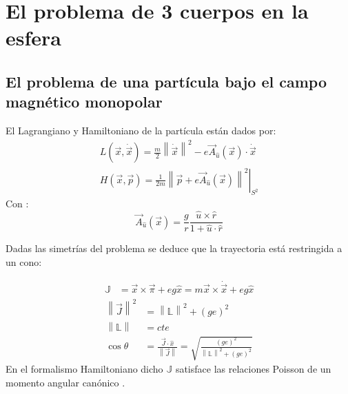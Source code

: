 \documentclass[xcolor=dvipsnames]{beamer}
\newcommand{\norm}[1]{\left\lVert #1 \right\rVert}
\newcommand{\roundP}[1]{\left( #1 \right)}
\begin{document}
\section{El problema de 3 cuerpos en la esfera}
\subsection{El problema de una partícula bajo el campo magnético monopolar}
\begin{frame}
El Lagrangiano y Hamiltoniano de la partícula están dados por:
\begin{align*}
L\roundP{\vec{x},\dot{\vec{x}}} = \frac{m}{2}\norm{\dot{\vec{x}}}^2 - e\vec{A}_{\hat{u}}(\vec{x})\cdot\dot{\vec{x}}\\
H\roundP{\vec{x},\vec{p}} = \left.\frac{1}{2m}\norm{\vec{p}+e\vec{A}_{\hat{u}}(\vec{x})}^2\right|_{S^2}
\end{align*}
Con \cite{vectorPotentials}:
\begin{equation*}
\vec{A}_{\hat{u}}(\vec{x}) = \frac{g}{r}\frac{\hat{u}\times\hat{r}}{1+\hat{u}\cdot\hat{r}}
\end{equation*}
\end{frame}
\begin{frame}
Dadas las simetrías del problema se deduce que la trayectoria está restringida a un cono:

\begin{align*}
\mathbb{J} &= \vec{x}\times\vec{\pi}+{eg}\hat{x} = m{\vec{x}}\times\dot{\vec{x}} + eg\hat{x}
\end{align*}
\begin{equation}
\begin{aligned}
\norm{\vec{J}}^2 &= \norm{\mathbb{L}}^2 +\roundP{ge}^2\\
\norm{\mathbb{L}} &= cte\\
\cos{\theta} &= \frac{\vec{J}\cdot\hat{x}}{\norm{\vec{J}}} = \sqrt{\frac{\roundP{ge}^2}{\norm{\mathbb{L}}^2 +\roundP{ge}^2}}
\end{aligned}
\label{eq:poincarecone}
\end{equation}
En el formalismo Hamiltoniano dicho $\mathbb{J}$ satisface las relaciones Poisson de un momento angular canónico \cite{haldane}.\\
\end{frame}
\end{document}
